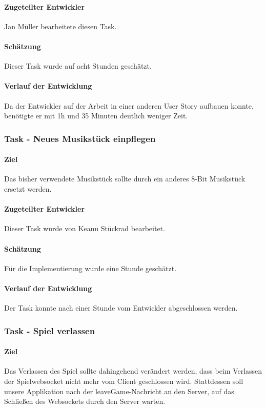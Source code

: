 \documentclass[12pt, titlepage]{scrartcl}
\begin{document}
			\paragraph{Zugeteilter Entwickler} Jan Müller bearbeitete diesen Task.
			\paragraph{Schätzung}
			Dieser Task wurde auf acht Stunden geschätzt.
			\paragraph{Verlauf der Entwicklung} Da der Entwickler auf der Arbeit in einer anderen User Story aufbauen konnte, benötigte er mit 1h und 35 Minuten deutlich weniger Zeit.
			\subsubsection{Task - Neues Musikstück einpflegen}
			\paragraph{Ziel} Das bisher verwendete Musikstück sollte durch ein anderes 8-Bit Musikstück ersetzt werden.
			\paragraph{Zugeteilter Entwickler} Dieser Task wurde von Keanu Stückrad bearbeitet.
			\paragraph{Schätzung}
			Für die Implementierung wurde eine Stunde geschätzt.
			\paragraph{Verlauf der Entwicklung} Der Task konnte nach einer Stunde vom Entwickler abgeschlossen werden.
			\subsubsection{Task - Spiel verlassen}
			\paragraph{Ziel} Das Verlassen des Spiel sollte dahingehend verändert werden, dass beim Verlassen der Spielwebsocket nicht mehr vom Client geschlossen wird. Stattdessen soll unsere Applikation nach der leaveGame-Nachricht an den Server, auf das Schließen des Websockets durch den Server warten.
\end{document}

